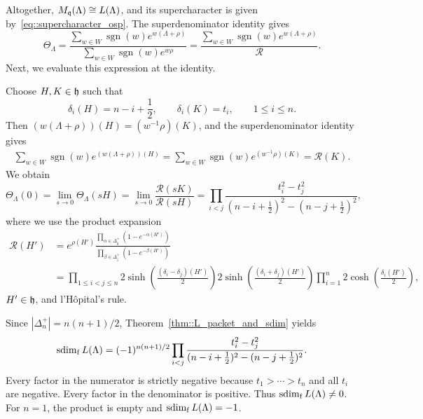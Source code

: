 \begin{example}
Altogether, $M_{{\mathfrak q}}(\Lambda)\cong L(\Lambda)$, and its
supercharacter is given by~\eqref{eq::supercharacter_osp}.
The superdenominator identity
\cite[Appendix~A.1]{creutzig_garner2026} gives
\begin{equation*}
\Theta_\Lambda
=
\frac{\sum_{w\in W}\operatorname{sgn}(w)e^{w(\Lambda+\rho)}}
     {\sum_{w\in W}\operatorname{sgn}(w)e^{w\rho}}
=
\frac{\sum_{w\in W}\operatorname{sgn}(w)e^{w(\Lambda+\rho)}}
     {\mathcal R}.
\end{equation*}
Next, we evaluate this expression at the identity.

Choose $H,K\in{\mathfrak h}$ such that
\begin{equation*}
\delta_i(H)=n-i+\frac12,
\qquad
\delta_i(K)=t_i,
\qquad 1\leq i\leq n.
\end{equation*}
Then $(w(\Lambda+\rho))(H)=(w^{-1}\rho)(K)$, and the superdenominator identity gives
\begin{equation*}
\begin{aligned}
\sum_{w\in W}\operatorname{sgn}(w)
e^{(w(\Lambda+\rho))(H)}
=
\sum_{w\in W}\operatorname{sgn}(w)
e^{(w^{-1}\rho)(K)}
=\mathcal R(K).
\end{aligned}
\end{equation*}
We obtain 
\begin{equation*}
\Theta_{\Lambda}(0)=\lim_{s\to 0}\Theta_\Lambda(sH)=\lim_{s\to 0}\frac{\mathcal R(sK)}{\mathcal R(sH)}=
\prod_{i<j}
\frac{t_i^2-t_j^2}
     {(n-i+\frac12)^2-(n-j+\frac12)^2},
\end{equation*}
where we use the product expansion 
\begin{equation*}
\begin{aligned}
\mathcal R(H')&=
e^{\rho(H')}
\frac{\prod_{\alpha\in\Delta_{\bar0}^+}
      (1-e^{-\alpha(H')})}
     {\prod_{\beta\in\Delta_{\bar1}^+}
      (1-e^{-\beta(H')})}\\
&=
\prod_{1\leq i<j\leq n}
2\sinh\left(\tfrac{(\delta_i-\delta_j)(H')}{2}\right)
2\sinh\left(\tfrac{(\delta_i+\delta_j)(H')}{2}\right)
\prod_{i=1}^n
2\cosh\left(\tfrac{\delta_i(H')}{2}\right),
\end{aligned}
\end{equation*}
$H'\in {\mathfrak h}$, and l'Hôpital's rule.

Since $|\Delta_n^+|=n(n+1)/2$,
Theorem~\ref{thm::L_packet_and_sdim} yields
\begin{equation*}
\operatorname{sdim}_{\mathrm f} L(\Lambda)
=
(-1)^{n(n+1)/2}
\prod_{i<j}
\frac{t_i^2-t_j^2}
     {(n-i+\frac12)^2-(n-j+\frac12)^2}.
\end{equation*}
Every factor in the numerator is strictly negative because
$t_1>\cdots>t_n$ and all $t_i$ are negative. Every factor in the denominator is positive. Thus $\operatorname{sdim}_{\mathrm f} L(\Lambda)\neq0$. For $n=1$, the product is empty and
$\operatorname{sdim}_{\mathrm f} L(\Lambda)=-1$.
\end{example}

